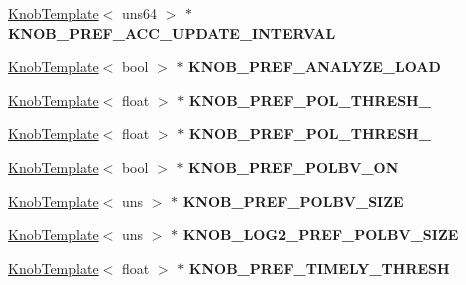 \begin{DoxyCompactItemize}
\item 
\hypertarget{classall__knobs__c_a5d799953ce2188111e11f90d953a6452}{
\hyperlink{classKnobTemplate}{KnobTemplate}$<$ uns64 $>$ $\ast$ {\bfseries KNOB\_\-PREF\_\-ACC\_\-UPDATE\_\-INTERVAL}}
\label{classall__knobs__c_a5d799953ce2188111e11f90d953a6452}

\item 
\hypertarget{classall__knobs__c_a084d675eda3d67e72f7f0edd827165f9}{
\hyperlink{classKnobTemplate}{KnobTemplate}$<$ bool $>$ $\ast$ {\bfseries KNOB\_\-PREF\_\-ANALYZE\_\-LOAD}}
\label{classall__knobs__c_a084d675eda3d67e72f7f0edd827165f9}

\item 
\hypertarget{classall__knobs__c_aba17ccf3420d8f14cf97e40463b3c599}{
\hyperlink{classKnobTemplate}{KnobTemplate}$<$ float $>$ $\ast$ {\bfseries KNOB\_\-PREF\_\-POL\_\-THRESH\_}}
\label{classall__knobs__c_aba17ccf3420d8f14cf97e40463b3c599}

\item 
\hypertarget{classall__knobs__c_a8ea98d9b396ecbc237ac8f7505e215ec}{
\hyperlink{classKnobTemplate}{KnobTemplate}$<$ float $>$ $\ast$ {\bfseries KNOB\_\-PREF\_\-POL\_\-THRESH\_}}
\label{classall__knobs__c_a8ea98d9b396ecbc237ac8f7505e215ec}

\item 
\hypertarget{classall__knobs__c_aba537d57c59ffb268053480eccaa4261}{
\hyperlink{classKnobTemplate}{KnobTemplate}$<$ bool $>$ $\ast$ {\bfseries KNOB\_\-PREF\_\-POLBV\_\-ON}}
\label{classall__knobs__c_aba537d57c59ffb268053480eccaa4261}

\item 
\hypertarget{classall__knobs__c_ac0f5829dd87d03595c78152bf53650b0}{
\hyperlink{classKnobTemplate}{KnobTemplate}$<$ uns $>$ $\ast$ {\bfseries KNOB\_\-PREF\_\-POLBV\_\-SIZE}}
\label{classall__knobs__c_ac0f5829dd87d03595c78152bf53650b0}

\item 
\hypertarget{classall__knobs__c_a09daaa550b11f8cb187a36d93527148b}{
\hyperlink{classKnobTemplate}{KnobTemplate}$<$ uns $>$ $\ast$ {\bfseries KNOB\_\-LOG2\_\-PREF\_\-POLBV\_\-SIZE}}
\label{classall__knobs__c_a09daaa550b11f8cb187a36d93527148b}

\item 
\hypertarget{classall__knobs__c_aa142cdab16e28aceeafb0ffb4c7c2c11}{
\hyperlink{classKnobTemplate}{KnobTemplate}$<$ float $>$ $\ast$ {\bfseries KNOB\_\-PREF\_\-TIMELY\_\-THRESH}}
\label{classall__knobs__c_aa142cdab16e28aceeafb0ffb4c7c2c11}


\end{DoxyCompactItemize}
